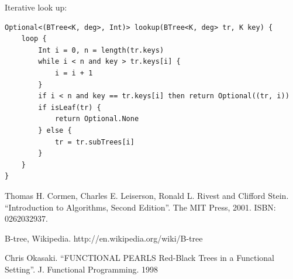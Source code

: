 \documentclass[b5paper]{article}
\begin{document}
Iterative look up:

\begin{lstlisting}[language = Bourbaki]
Optional<(BTree<K, deg>, Int)> lookup(BTree<K, deg> tr, K key) {
    loop {
        Int i = 0, n = length(tr.keys)
        while i < n and key > tr.keys[i] {
            i = i + 1
        }
        if i < n and key == tr.keys[i] then return Optional((tr, i))
        if isLeaf(tr) {
            return Optional.None
        } else {
            tr = tr.subTrees[i]
        }
    }
}
\end{lstlisting}

\ifx\wholebook\relax \else
\begin{thebibliography}{99}

Thomas H. Cormen, Charles E. Leiserson, Ronald L. Rivest and Clifford Stein. ``Introduction to Algorithms, Second Edition''. The MIT Press, 2001. ISBN: 0262032937.

B-tree, Wikipedia. http://en.wikipedia.org/wiki/B-tree

Chris Okasaki. ``FUNCTIONAL PEARLS Red-Black Trees in a Functional Setting''. J. Functional Programming. 1998

\end{thebibliography}

\expandafter\enddocument
\fi
\end{document}
